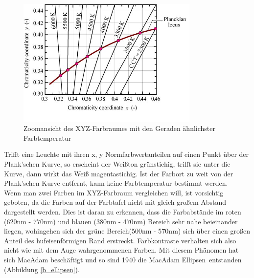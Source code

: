 \begin{figure}[H]     %
\centering
\includegraphics[width=0.8\textwidth]{bilder/cct} 
\caption {Zoomansicht des XYZ-Farbraumes mit den \glqq Geraden ähnlichster Farbtemperatur\grqq\ \protect\footnotemark}\label{b_cct}
\end{figure}


Trifft eine Leuchte mit ihren x, y Normfarbwertanteilen auf einen Punkt über der Plank'schen Kurve, so erscheint der Weißton grünstichig, trifft sie unter die Kurve, dann wirkt das Weiß magentastichig. Ist der Farbort zu weit von der Plank'schen Kurve entfernt, kann keine Farbtemperatur bestimmt werden.\\

Wenn man zwei Farben im XYZ-Farbraum vergleichen will, ist vorsichtig geboten, da die Farben auf der Farbtafel nicht mit gleich großem Abstand dargestellt werden. Dies ist daran zu erkennen, dass die Farbabstände im roten (620nm - 770nm) und blauen (380nm - 470nm) Bereich sehr nahe beieinander liegen, wohingehen sich der grüne Bereich(500nm - 570nm) sich über einen großen Anteil des hufeisenförmigen Rand erstreckt. Farbkontraste verhalten sich also nicht wie mit dem Auge wahrgenommenen Farben. Mit diesem Phänomen hat sich MacAdam beschäftigt und so sind 1940 die \glqq MacAdam Ellipsen\grqq\ entstanden (Abbildung \ref{b_ellipsen}).

